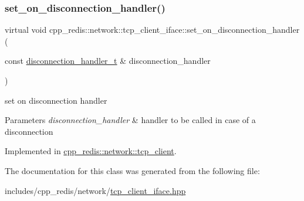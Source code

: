 \subsubsection{\texorpdfstring{set\+\_\+on\+\_\+disconnection\+\_\+handler()}{set\_on\_disconnection\_handler()}}
{\footnotesize\ttfamily virtual void cpp\+\_\+redis\+::network\+::tcp\+\_\+client\+\_\+iface\+::set\+\_\+on\+\_\+disconnection\+\_\+handler (\begin{DoxyParamCaption}\item[{const \hyperlink{classcpp__redis_1_1network_1_1tcp__client__iface_a9a7d5942205db8be03da581a848b8ec0}{disconnection\+\_\+handler\+\_\+t} \&}]{disconnection\+\_\+handler }\end{DoxyParamCaption})\hspace{0.3cm}{\ttfamily [pure virtual]}}

set on disconnection handler


\begin{DoxyParams}{Parameters}
{\em disconnection\+\_\+handler} & handler to be called in case of a disconnection \\
\hline
\end{DoxyParams}


Implemented in \hyperlink{classcpp__redis_1_1network_1_1tcp__client_a24ccdf6dc467aac13cb832a395adb38d}{cpp\+\_\+redis\+::network\+::tcp\+\_\+client}.



The documentation for this class was generated from the following file\+:\begin{DoxyCompactItemize}
\item 
includes/cpp\+\_\+redis/network/\hyperlink{tcp__client__iface_8hpp}{tcp\+\_\+client\+\_\+iface.\+hpp}\end{DoxyCompactItemize}
